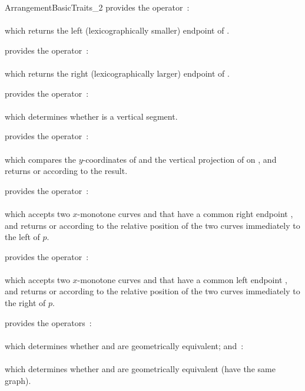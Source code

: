 \begin{ccRefConcept}{ArrangementBasicTraits_2}
{provides the operator~: \\
  \\
 which returns the left (lexicographically smaller) endpoint of .}

{provides the operator~: \\
  \\
 which returns the right (lexicographically larger) endpoint of .}

{provides the operator~: \\
  \\
 which determines whether  is a vertical segment.}

{provides the operator~: \\
  \\
 which compares the $y$-coordinates of  and the vertical projection
 of  on , and returns  or 
 according to the result.}

{provides the operator~: \\
  \\
 which accepts two $x$-monotone curves  and  that have
 a common right endpoint , and returns  or
  according to the relative position of the two curves
 immediately to the left of $p$.}

{provides the operator~: \\
  \\
 which accepts two $x$-monotone curves  and  that have
 a common left endpoint , and returns  or
  according to the relative position of the two curves
 immediately to the right of $p$.}

{provides the operators~: \\
  \\
 which determines whether  and  are geometrically
 equivalent; and~: \\
  \\
 which determines whether  and  are geometrically equivalent
 (have the same graph).}


\end{ccRefConcept}
